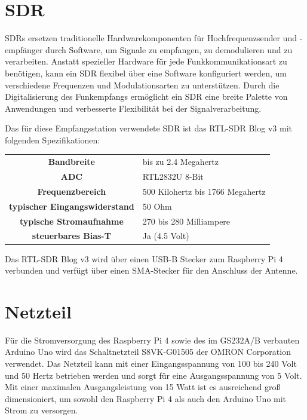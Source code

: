 \section{SDR}
\label{sec:sdr}
SDRs ersetzen traditionelle Hardwarekomponenten für Hochfrequenzsender und -empfänger durch Software, um Signale zu empfangen, zu demodulieren und zu verarbeiten. Anstatt spezieller Hardware für jede Funkkommunikationsart zu benötigen, kann ein SDR flexibel über eine Software konfiguriert werden, um verschiedene Frequenzen und Modulationsarten zu unterstützen. Durch die Digitalisierung des Funkempfangs ermöglicht ein SDR eine breite Palette von Anwendungen und verbesserte Flexibilität bei der Signalverarbeitung. \cite{noauthor_sdr_nodate}

Das für diese Empfangsstation verwendete SDR ist das RTL-SDR Blog v3 mit folgenden Spezifikationen:
\begin{table}
	\centering
	\begin{tabular}{cl}
		\textbf{Bandbreite} & bis zu 2.4 Megahertz \\
		\textbf{ADC} & RTL2832U 8-Bit \\
		\textbf{Frequenzbereich} & 500 Kilohertz bis 1766 Megahertz \\
		\textbf{typischer Eingangswiderstand} & 50 Ohm \\
		\textbf{typische Stromaufnahme} & 270 bis 280 Milliampere \\
		\textbf{steuerbares Bias-T} & Ja (4.5 Volt) \\
	\end{tabular}
\end{table}

Das RTL-SDR Blog v3 wird über einen USB-B Stecker zum Raspberry Pi 4 verbunden und verfügt über einen SMA-Stecker für den Anschluss der Antenne.\cite{noauthor_rtl-sdr_nodate}

\section{Netzteil}
\label{sec:Netzteil}
Für die Stromversorgung des Raspberry Pi 4 sowie des im GS232A/B verbauten Arduino Uno wird das Schaltnetzteil S8VK-G01505 der OMRON Corporation verwendet. Das Netzteil kann mit einer Eingangsspannung von 100 bis 240 Volt und 50 Hertz betrieben werden und sorgt für eine Ausgangsspannung von 5 Volt. Mit einer maximalen Ausgangsleistung von 15 Watt ist es ausreichend groß dimensioniert, um sowohl den Raspberry Pi 4 \cite{noauthor_power_nodate} als auch den Arduino Uno \cite{noauthor_r3_nodate} mit Strom zu versorgen. \cite{noauthor_s8vk-g01505_nodate}


